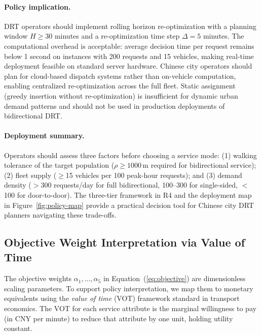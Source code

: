 \paragraph{Policy implication.}
DRT operators should implement rolling horizon re-optimization with a
planning window $H \geq 30$ minutes and a re-optimization time step
$\Delta = 5$ minutes. The computational overhead is acceptable: average
decision time per request remains below 1 second on instances with 200
requests and 15 vehicles, making real-time deployment feasible on standard
server hardware. Chinese city operators should plan for cloud-based dispatch
systems rather than on-vehicle computation, enabling centralized
re-optimization across the full fleet. Static assignment (greedy insertion
without re-optimization) is insufficient for dynamic urban demand patterns
and should not be used in production deployments of bidirectional DRT.

\paragraph{Deployment summary.}
Operators should assess three factors before choosing a service mode:
(1) walking tolerance of the target population ($\rho \geq 1000$\,m
required for bidirectional service); (2) fleet supply ($\geq$15 vehicles
per 100 peak-hour requests); and (3) demand density ($>$300 requests/day
for full bidirectional, 100--300 for single-sided, $<$100 for
door-to-door). The three-tier framework in R4 and the deployment map in
Figure~\ref{fig:policy-map} provide a practical decision tool for Chinese
city DRT planners navigating these trade-offs.

\subsection{Objective Weight Interpretation via Value of Time}\label{subsec:vot-mapping}

The objective weights $\alpha_1, \ldots, \alpha_5$ in Equation~(\ref{eq:objective})
are dimensionless scaling parameters. To support policy interpretation, we map
them to monetary equivalents using the \emph{value of time} (VOT) framework
standard in transport economics. The VOT for each service attribute is the
marginal willingness to pay (in CNY per minute) to reduce that attribute by
one unit, holding utility constant.

